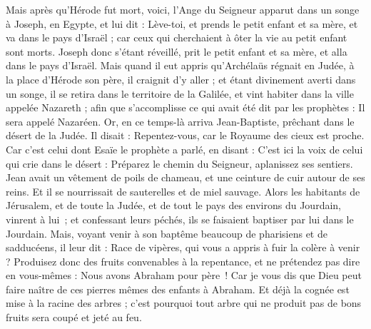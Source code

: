 \begin{multicols}{2}
Mais après qu'Hérode fut mort, voici, l'Ange du Seigneur apparut dans un songe à Joseph, en Egypte,
et lui dit : Lève-toi, et prends le petit enfant et sa mère, et va dans le pays d'Israël ; car ceux qui cherchaient à ôter la vie au petit enfant sont morts.
Joseph donc s'étant réveillé, prit le petit enfant et sa mère, et alla dans le pays d'Israël.
Mais quand il eut appris qu'Archélaüs régnait en Judée, à la place d'Hérode son père, il craignit d'y aller ; et étant divinement averti dans un songe, il se retira dans le territoire de la Galilée,
et vint habiter dans la ville appelée Nazareth ; afin que s’accomplisse ce qui avait été dit par les prophètes : Il sera appelé Nazaréen{}.
\VerseOne{}Or, en ce temps-là arriva Jean-Baptiste, prêchant dans le désert de la Judée.
Il disait : Repentez-vous, car le Royaume des cieux est proche.
Car c'est celui dont Esaïe le prophète a parlé, en disant : C’est ici la voix de celui qui crie dans le désert : Préparez le chemin du Seigneur, aplanissez ses sentiers.
Jean avait un vêtement de poils de chameau, et une ceinture de cuir autour de ses reins. Et il se nourrissait de sauterelles et de miel sauvage.
Alors les habitants de Jérusalem, et de toute la Judée, et de tout le pays des environs du Jourdain, vinrent à lui ;
et confessant leurs péchés, ils se faisaient baptiser par lui dans le Jourdain.
Mais, voyant venir à son baptême beaucoup de pharisiens et de sadducéens, il leur dit : Race de vipères, qui vous a appris à fuir la colère à venir ?
Produisez donc des fruits convenables à la repentance,
et ne prétendez pas dire en vous-mêmes : Nous avons Abraham pour père ! Car je vous dis que Dieu peut faire naître de ces pierres mêmes des enfants à Abraham.
Et déjà la cognée est mise à la racine des arbres ; c'est pourquoi tout arbre qui ne produit pas de bons fruits sera coupé et jeté au feu.

\end{multicols}
